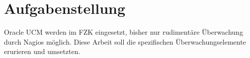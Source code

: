 \section{Aufgabenstellung}
Oracle UCM werden im FZK eingesetzt, bisher nur rudimentäre Überwachung durch Nagios möglich.
Diese Arbeit soll die spezifischen Überwachungselemente erurieren und umsetzten.